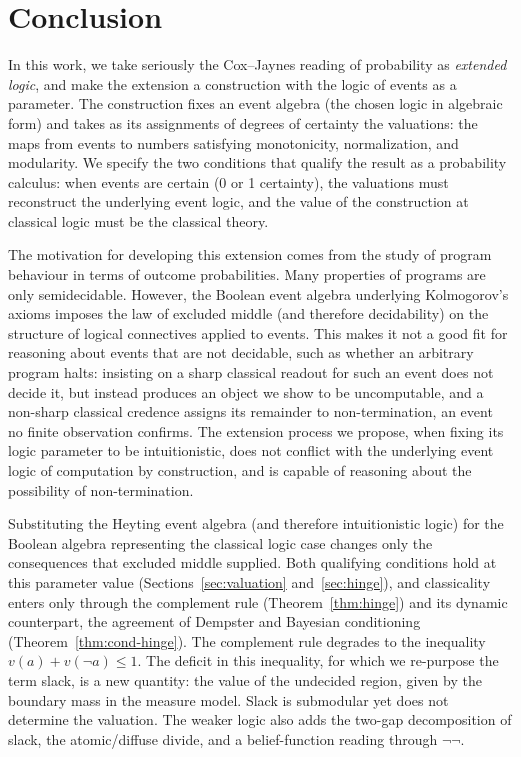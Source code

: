 \section{Conclusion}
\label{sec:conclusion}

In this work, we take seriously the Cox--Jaynes reading of
probability as \emph{extended logic}, and
make the extension a construction with the logic of events as a
parameter.  The construction fixes an event algebra (the chosen
logic in algebraic form) and takes as its assignments of degrees of
certainty the valuations: the maps from events to numbers satisfying
monotonicity, normalization, and modularity.  We specify the 
two conditions that qualify
the result as a probability calculus: when events are certain (0 or 1 certainty),
the valuations must reconstruct
the underlying event logic, and the value of the construction at
classical logic must be the classical theory. 

The motivation for developing this extension comes from the 
study of program behaviour in terms of outcome probabilities. 
Many properties of programs are only semidecidable.
However, the Boolean
event algebra underlying Kolmogorov's axioms
imposes the law of excluded middle (and therefore decidability) on the
structure of logical connectives applied to events. This makes it
not a good fit for reasoning about events that are not decidable, such
as whether an arbitrary program halts: insisting on a sharp classical
readout for such an event does not decide it, but instead produces an
object we show to be uncomputable, and a non-sharp classical credence
assigns its remainder to non-termination, an event no finite
observation confirms.
The extension process 
we propose, when fixing its logic parameter to be intuitionistic,
does not conflict with the underlying event logic of computation
by construction, and is capable of reasoning about the possibility of
non-termination.

Substituting the Heyting event algebra (and therefore intuitionistic logic)
for the Boolean algebra representing the classical logic case
changes only the consequences that excluded middle supplied.  Both
qualifying conditions hold at this parameter value
(Sections~\ref{sec:valuation} and~\ref{sec:hinge}), and classicality
enters only through the complement rule (Theorem~\ref{thm:hinge})
and its dynamic counterpart, the agreement of Dempster and Bayesian
conditioning (Theorem~\ref{thm:cond-hinge}).  The complement rule
degrades to the inequality $v(a) + v(\neg a) \le 1$.  The deficit in
this inequality, for which we re-purpose the term slack, is a new
quantity: the value of the undecided region, given by the boundary
mass in the measure model.  Slack is submodular yet does not
determine the valuation.  The weaker logic also adds the two-gap
decomposition of slack, the atomic/diffuse divide, and a
belief-function reading through $\neg\neg$.  

